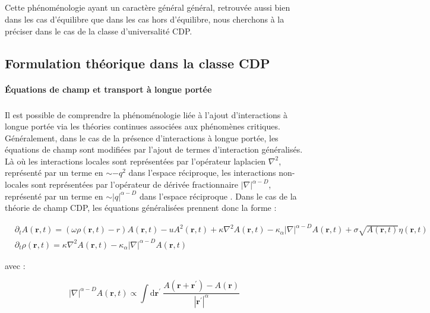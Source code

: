 \subparagraph{}Cette phénoménologie ayant un caractère général général, retrouvée aussi bien dans les cas d'équilibre que dans les cas hors d'équilibre, nous cherchons à la préciser dans le cas de la classe d'universalité CDP.

\subsection{Formulation théorique dans la classe CDP}

\paragraph{Équations de champ et transport à longue portée}

\subparagraph{}Il est possible de comprendre la phénoménologie liée à l'ajout d'interactions à longue portée via les théories continues associées aux phénomènes critiques. Généralement, dans le cas de la présence d'interactions à longue portée, les équations de champ sont modifiées par l'ajout de termes d'interaction généralisés. Là où les interactions locales sont représentées par l'opérateur laplacien $\nabla^2$, représenté par un terme en $\sim -q^2$ dans l'espace réciproque, les interactions non-locales sont représentées par l'opérateur de dérivée fractionnaire $|\nabla|^{\alpha-D}$, représenté par un terme en $\sim |q|^{\alpha-D}$ dans l'espace réciproque \cite{hinrichsen_non_equilibrium_2007}. Dans le cas de la théorie de champ CDP, les équations généralisées prennent donc la forme :

\begin{equation}
\begin{aligned}
	&\partial_t A(\mathbf{r}, t) = (\omega\rho (\mathbf{r}, t) - r)A(\mathbf{r}, t) - uA^2(\mathbf{r}, t) + \kappa\nabla^2 A (\mathbf{r}, t) - \kappa_\alpha|\nabla|^{\alpha-D} A (\mathbf{r}, t) + \sigma \sqrt{A(\mathbf{r}, t)} \eta(\mathbf{r}, t)\\
	&\partial_t \rho (\mathbf{r}, t) = \kappa\nabla^2 A (\mathbf{r}, t)- \kappa_\alpha|\nabla|^{\alpha-D} A (\mathbf{r}, t)
\end{aligned}
\label{eq:LRCDP}
\end{equation}

\noindent avec :

\begin{equation}
	|\nabla|^{\alpha-D} A (\mathbf{r}, t) \propto \int \mathrm{d}\mathbf{r}^\prime ~ \frac{A(\mathbf{r}+\mathbf{r}^\prime)-A(\mathbf{r})}{|\mathbf{r}^{\prime}|^{\alpha}}
\end{equation}

